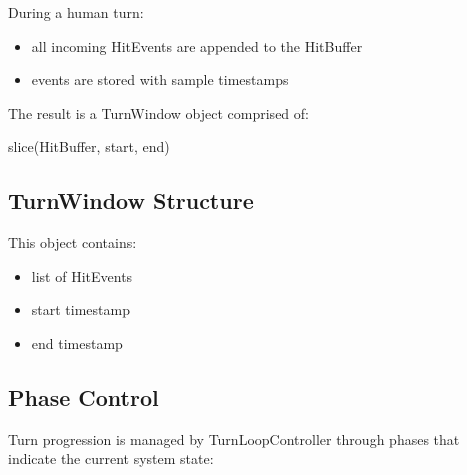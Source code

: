 During a human turn:

\begin{itemize}
\item
  all incoming HitEvents are appended to the HitBuffer
\item
  events are stored with sample timestamps
\end{itemize}

The result is a TurnWindow object comprised of:

slice(HitBuffer, start, end)

\subsection{TurnWindow Structure}\label{turnwindow-structure}

This object contains:

\begin{itemize}
\item
  list of HitEvents
\item
  start timestamp
\item
  end timestamp
\end{itemize}

\subsection{Phase Control}\label{phase-control}

Turn progression is managed by TurnLoopController through phases that
indicate the current system state:

